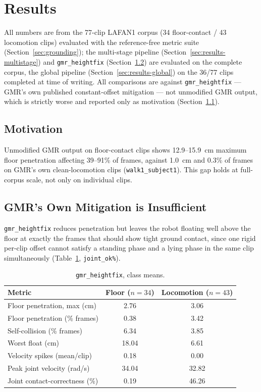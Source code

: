 \section{Results}
\label{sec:results}

All numbers are from the 77-clip LAFAN1 corpus (34 floor-contact / 43
locomotion clips) evaluated with the reference-free metric suite
(Section~\ref{sec:grounding}); the multi-stage pipeline
(Section~\ref{sec:results-multistage}) and \texttt{gmr\_heightfix}
(Section~\ref{sec:results-heightfix}) are evaluated on the complete corpus,
the global pipeline (Section~\ref{sec:results-global}) on the 36/77 clips
completed at time of writing. All comparisons are against
\texttt{gmr\_heightfix} --- GMR's own published constant-offset mitigation
--- not unmodified GMR output, which is strictly worse and reported only as
motivation (Section~\ref{sec:results-motivation}).

\subsection{Motivation}
\label{sec:results-motivation}

Unmodified GMR output on floor-contact clips shows 12.9--15.9~cm maximum
floor penetration affecting 39--91\% of frames, against 1.0~cm and 0.3\% of
frames on GMR's own clean-locomotion clips (\texttt{walk1\_subject1}). This
gap holds at full-corpus scale, not only on individual clips.

\subsection{GMR's Own Mitigation is Insufficient}
\label{sec:results-heightfix}

\texttt{gmr\_heightfix} reduces penetration but leaves the robot floating
well above the floor at exactly the frames that should show tight ground
contact, since one rigid per-clip offset cannot satisfy a standing phase
and a lying phase in the same clip simultaneously
(Table~\ref{tab:heightfix}, \texttt{joint\_ok\%}).

\begin{table}[t]
\centering
\caption{\texttt{gmr\_heightfix}, class means.}
\label{tab:heightfix}
\begin{tabular}{lcc}
\toprule
Metric & Floor ($n=34$) & Locomotion ($n=43$) \\
\midrule
Floor penetration, max (cm)     & 2.76  & 3.06  \\
Floor penetration (\% frames)   & 0.38  & 3.42  \\
Self-collision (\% frames)      & 6.34  & 3.85  \\
Worst float (cm)                & 18.04 & 6.61  \\
Velocity spikes (mean/clip)     & 0.18  & 0.00  \\
Peak joint velocity (rad/s)     & 34.04 & 32.82 \\
Joint contact-correctness (\%)  & 0.19  & 46.26 \\
\bottomrule
\end{tabular}
\end{table}

